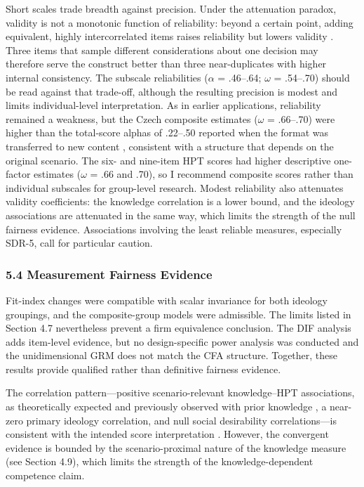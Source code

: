 \documentclass[
  12pt,
]{article}
\newcommand{\Loc}[1]{\linelabel{loc:#1}}
\newcommand{\LocEnd}[1]{\linelabel{loc:#1:end}}
\begin{document}
\Loc{s53}Short scales trade breadth against precision. Under the attenuation paradox,
validity is not a monotonic function of reliability: beyond a certain point,
adding equivalent, highly intercorrelated items raises reliability but lowers
validity \parencites[pp.~493--494, 504]{Loevinger1954Attenuation}[see
also][p.~678]{Loevinger1957Objective}. Three items that sample different
considerations about one decision may therefore serve the construct better than
three near-duplicates with higher internal consistency. The subscale
reliabilities (\(\alpha\) = .46--.64; \(\omega\) = .54--.70) should be read
against that trade-off, although the resulting precision is modest and limits
individual-level interpretation. \Loc{s53-transfer}As in earlier applications, reliability
remained a weakness, but the Czech composite estimates (\(\omega\) = .66--.70)
were higher than the total-score alphas of .22--.50 reported when the format
was transferred to new content
\citep{Huijgen_et_al2014Testing,Wilschut_Schiphorst2019One}, consistent with a
structure that depends on the original scenario.\LocEnd{s53-transfer} The six- and nine-item HPT
scores had higher descriptive one-factor estimates (\(\omega\) = .66 and .70),
so I recommend composite scores rather than individual subscales for
group-level research. Modest reliability also attenuates validity
coefficients: the knowledge correlation is a lower bound, and the ideology
associations are attenuated in the same way, which limits the strength of the
null fairness evidence. Associations involving the least reliable measures,
especially SDR-5, call for particular caution.\LocEnd{s53}

\hypertarget{measurement-fairness-evidence}{%
\subsubsection{5.4 Measurement Fairness Evidence}\label{measurement-fairness-evidence}}

Fit-index changes were compatible with scalar invariance for both
ideology groupings, and the composite-group models were admissible. The
limits listed in Section 4.7 nevertheless prevent a firm equivalence
conclusion. The DIF analysis
adds item-level evidence, but no design-specific power analysis was
conducted and the unidimensional GRM does not match the CFA structure.
Together, these results provide qualified rather than definitive
fairness evidence.

The correlation pattern---positive scenario-relevant knowledge--HPT
associations, as theoretically expected \citep{vanBoxtel_vanDrie2018Historical} and previously observed with prior knowledge \citep{Huijgen_et_al2017Toward}, a near-zero primary ideology correlation, and null social desirability
correlations---is consistent with the intended score interpretation
\citep{AERA2014Standards,Messick1995Validity}. However, the convergent evidence is bounded by the
scenario-proximal nature of the knowledge measure (see Section 4.9),
which limits the strength of the knowledge-dependent competence claim.
\end{document}
